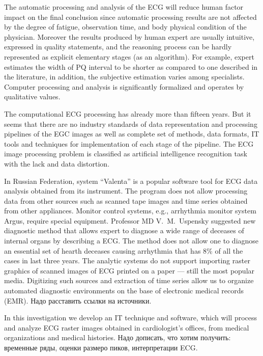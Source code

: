 \documentclass[runningheads]{AIIT}
\newcommand{\nnn}[2][rcolor]{\noindent%
\textcolor{eclr}{}\textcolor{#1}{#2}\textcolor{eclr}{}}
\begin{document}
The automatic processing and analysis of the ECG will reduce human factor impact on the final conclusion since automatic processing results are not affected by the degree of fatigue, observation time, and body physical condition of the physician.  Moreover the results produced by human expert are usually intuitive, expressed in quality statements, and the reasoning process can be hardly represented as explicit elementary stages (as an algorithm).  For example, expert estimates the width of PQ interval to be shorter as compared to one described in the literature, in addition, the subjective estimation varies among specialists.  Computer processing and analysis is significantly formalized and operates by qualitative values.

The computational ECG processing has already more than fifteen years.  But it seems that there are no industry standards of data representation and processing pipelines of the EGC images as well as complete set of methods, data formats, IT tools and techniques for implementation of each stage of the pipeline.  The ECG image processing problem is classified as artificial intelligence recognition task with the lack and data distortion.

In Russian Federation, system ``Valenta'' is a popular software tool for ECG data analysis obtained from its instrument.  The program does not allow processing data from other sources such as scanned tape images and time series obtained from other appliances.  Monitor control systems, e.g., arrhythmia monitor system Argus, require special equipment.  Professor MD V.~M.~Uspensky suggested new diagnostic method that allows expert to diagnose a wide range of deceases of internal organs by describing a ECG.  The method does not allow one to diagnose an essential set of hearth deceases causing arrhythmia that has 8\% of all the cases in last three years.  The analytic systems do not support importing raster graphics of scanned images of ECG printed on a paper --- still the most popular media.  Digitizing such sources and extraction of time series allow us to organize automated diagnostic environments on the base of electronic medical records (EMR). \nnn{Надо расставить ссылки на источники.}

In this investigation we develop an IT technique and software, which will process and analyze ECG raster images obtained in cardiologist's offices, from medical organizations and medical histories. \nnn{Надо дописать, что хотим получить: временные ряды, оценки размеро пиков, интерпретации ECG.}
\end{document}
